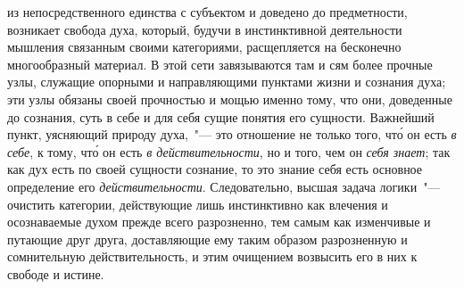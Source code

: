 из непосредственного единства с субъектом и доведено
до предметности, возникает свобода духа, который, будучи
в инстинктивной деятельности мышления связанным своими
категориями, расщепляется на бесконечно многообразный
материал. В этой сети завязываются там и сям
более прочные узлы, служащие опорными и направляющими
пунктами жизни и сознания духа; эти узлы обязаны
своей прочностью и мощью именно тому, что они, доведенные
до сознания, суть в себе и для себя сущие понятия
его сущности. Важнейший пункт, уясняющий природу
духа,~"--- это отношение не только того, чт\'о он есть \emph{в себе},
к тому, чт\'о он есть \emph{в действительности}, но и того, чем он
\emph{себя знает}; так как дух есть по своей сущности сознание,
то это знание себя есть основное определение его \emph{действительности}.
Следовательно, высшая задача логики~"---
очистить категории, действующие лишь инстинктивно как
влечения и осознаваемые духом прежде всего разрозненно,
тем самым как изменчивые и путающие друг друга,
доставляющие ему таким образом разрозненную и
сомнительную действительность, и этим очищением возвысить
его в них к свободе и истине.

